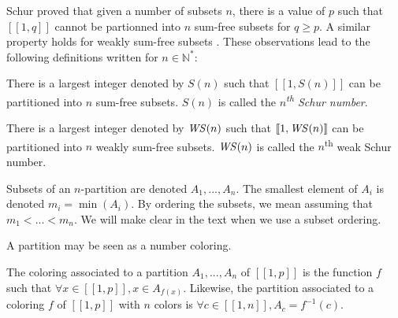 \par
Schur proved \cite{Schur1917} that given a number of subsets \(n\), there is a value of \(p\)
such that \([\![1,q]\!]\) cannot be partionned into \(n\) sum-free subsets for \(q \geqslant p\). A similar
property holds for weakly sum-free subsets \cite{Irving1973}. These observations lead to the following definitions
written for \(n \in \mathbb{N}^*\): 

\begin{definition}
There is a largest integer denoted by \(S(n)\) such that \([\![1, S(n)]\!]\) can be
 partitioned into \(n\) sum-free subsets. \(S(n)\) is called the \textit{\(n\)\textsuperscript{th} Schur number}.
\end{definition}

\begin{definition}
There is a largest integer denoted by \(\mathit{WS} (n)\) such that \([\![1, \mathit{WS} (n)]\!]\) 
can be partitioned into \(n\) weakly sum-free subsets. \(\mathit{WS}(n)\) is called the \(n\)\textsuperscript{th} weak Schur 
number.
\end{definition}

Subsets of an \(n\)-partition are denoted \(A_1, ..., A_n\). The smallest element of \(A_i\) is denoted  
\(m_i = \min(A_i)\). By ordering the subsets, we mean assuming that \(m_1 < ... < m_n\). We will make clear in the text 
when we use a subset ordering.

A partition may be seen as a number coloring.

\begin{definition}
The coloring associated to a partition \(A_1, ..., A_n\) of 
\([\![1, p]\!]\) is the function \(f\) such that \(\forall x \in [\![1, p]\!], x \in A_{f(x)}\). Likewise, the partition associated to
a coloring \(f\) of \([\![1, p]\!]\) with \(n\) colors is \(\forall c \in [\![1, n]\!], A_c = f^{-1}(c)\).
\end{definition}

